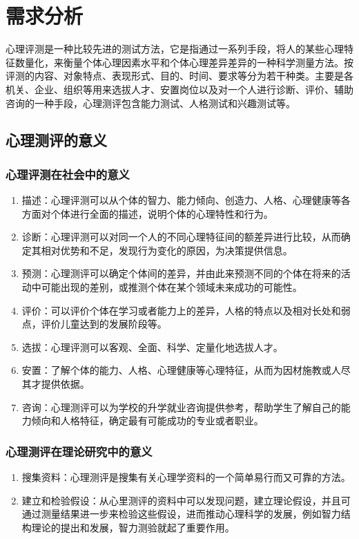 \section{需求分析}

心理评测是一种比较先进的测试方法，它是指通过一系列手段，将人的某些心理特征数量化，来衡量个体心理因素水平和个体心理差异差异的一种科学测量方法。按评测的内容、对象特点、表现形式、目的、时间、要求等分为若干种类。主要是各机关、企业、组织等用来选拔人才、安置岗位以及对一个人进行诊断、评价、辅助咨询的一种手段，心理测评包含能力测试、人格测试和兴趣测试等。

\subsection{心理测评的意义}

\subsubsection{心理评测在社会中的意义}

\begin{enumerate}
\item 描述：心理评测可以从个体的智力、能力倾向、创造力、人格、心理健康等各方面对个体进行全面的描述，说明个体的心理特性和行为。
\item 诊断：心理评测可以对同一个人的不同心理特征间的额差异进行比较，从而确定其相对优势和不足，发现行为变化的原因，为决策提供信息。
\item 预测：心理测评可以确定个体间的差异，并由此来预测不同的个体在将来的活动中可能出现的差别，或推测个体在某个领域未来成功的可能性。
\item 评价：可以评价个体在学习或者能力上的差异，人格的特点以及相对长处和弱点，评价儿童达到的发展阶段等。
\item 选拔：心理评测可以客观、全面、科学、定量化地选拔人才。
\item 安置：了解个体的能力、人格、心理健康等心理特征，从而为因材施教或人尽其才提供依据。
\item 咨询：心理测评可以为学校的升学就业咨询提供参考，帮助学生了解自己的能力倾向和人格特征，确定最有可能成功的专业或者职业。
\end{enumerate}

\subsubsection{心理测评在理论研究中的意义}

\begin{enumerate}
\item 搜集资料：心理测评是搜集有关心理学资料的一个简单易行而又可靠的方法。
\item 建立和检验假设：从心里测评的资料中可以发现问题，建立理论假设，并且可通过测量结果进一步来检验这些假设，进而推动心理科学的发展，例如智力结构理论的提出和发展，智力测验就起了重要作用。
\end{enumerate}

